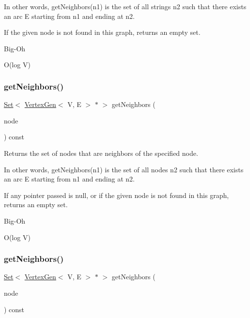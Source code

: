 In other words, get\+Neighbors(n1) is the set of all strings n2 such that there exists an arc E starting from n1 and ending at n2.

If the given node is not found in this graph, returns an empty set. \begin{DoxyRefDesc}{Big-\/\+Oh}
\item[\mbox{\hyperlink{BigOh__BigOh000072}{Big-\/\+Oh}}]O(log V) \end{DoxyRefDesc}
\mbox{\label{classGraph_a0e49b167f0623a8ae76040c3e5eab3fb}} 
\subsubsection{\texorpdfstring{get\+Neighbors()}{getNeighbors()}\hspace{0.1cm}{\footnotesize\ttfamily [1/2]}}
{\footnotesize\ttfamily \mbox{\hyperlink{classSet}{Set}}$<$ \mbox{\hyperlink{classVertexGen}{Vertex\+Gen}}$<$ V, E $>$  $\ast$ $>$ get\+Neighbors (\begin{DoxyParamCaption}\item[{\mbox{\hyperlink{classVertexGen}{Vertex\+Gen}}$<$ V, E $>$  $\ast$}]{node }\end{DoxyParamCaption}) const\hspace{0.3cm}{\ttfamily [inherited]}}



Returns the set of nodes that are neighbors of the specified node. 

In other words, get\+Neighbors(n1) is the set of all nodes n2 such that there exists an arc E starting from n1 and ending at n2.

If any pointer passed is null, or if the given node is not found in this graph, returns an empty set. \begin{DoxyRefDesc}{Big-\/\+Oh}
\item[\mbox{\hyperlink{BigOh__BigOh000073}{Big-\/\+Oh}}]O(log V) \end{DoxyRefDesc}
\mbox{\label{classGraph_a3a3720906c380f36b50530419330bfe5}} 
\subsubsection{\texorpdfstring{get\+Neighbors()}{getNeighbors()}\hspace{0.1cm}{\footnotesize\ttfamily [2/2]}}
{\footnotesize\ttfamily \mbox{\hyperlink{classSet}{Set}}$<$ \mbox{\hyperlink{classVertexGen}{Vertex\+Gen}}$<$ V, E $>$  $\ast$ $>$ get\+Neighbors (\begin{DoxyParamCaption}\item[{const std\+::string \&}]{node }\end{DoxyParamCaption}) const\hspace{0.3cm}{\ttfamily [inherited]}}



